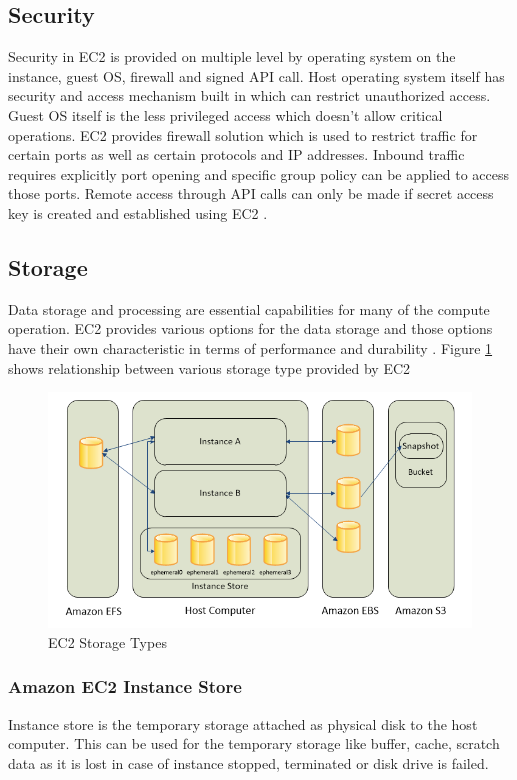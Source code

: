 \subsection{Security}
Security in EC2 is provided on multiple level by operating system on the instance, guest OS, firewall and signed API call. Host operating system itself has security and access mechanism built in which can restrict unauthorized access. Guest OS itself is the less privileged access which doesn't allow critical operations. EC2 provides firewall solution which is used to restrict traffic for certain ports as well as certain protocols and IP addresses. Inbound traffic requires explicitly port opening and specific group policy can be applied to access those ports. Remote access through API calls can only be made if secret access key is created and established using EC2 \cite{www-aws-ec2Security}.

\subsection{Storage}
Data storage and processing are essential capabilities for many of the compute operation. EC2 provides various options for the data storage and those options have their own characteristic in terms of performance and durability \cite{www-aws-ec2Storage}. Figure \ref{f:ec2-storage} shows relationship between various storage type provided by EC2
\begin{figure}[!ht]
  \centering\includegraphics[width=\columnwidth]{images/ec2Storage.PNG}
  \caption{EC2 Storage Types \cite{www-aws-ec2Storage}}\label{f:ec2-storage}
\end{figure}
\subsubsection{Amazon EC2 Instance Store} \cite{www-aws-ec2Storage}
Instance store is the temporary storage attached as physical disk to the host computer. This can be used for the temporary storage like buffer, cache, scratch data as it is lost in case of instance stopped, terminated or disk drive is failed.
